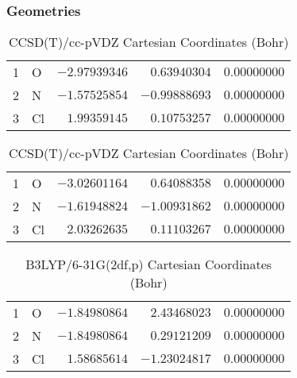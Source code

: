 \documentclass[10pt,oneside]{article}
\begin{document}
\begin{table}[h!]
\subsubsection*{Geometries}
\begin{multicols}{2}
\centering
\caption{CCSD(T)/cc-pVTZ Cartesian Coordinates (Bohr)}
\begin{tabular}{llrrr}
\toprule
1  & O  & $-2.97939346$ & $ 0.63940304$ & $ 0.00000000$ \\
2  & N  & $-1.57525854$ & $-0.99888693$ & $ 0.00000000$ \\
3  & Cl & $ 1.99359145$ & $ 0.10753257$ & $ 0.00000000$ \\
\bottomrule
\end{tabular}
\caption{CCSD(T)/cc-pVDZ Cartesian Coordinates (Bohr)}
\begin{tabular}{llrrr}
\toprule
1  & O  & $-3.02601164$ & $ 0.64088358$ & $ 0.00000000$ \\
2  & N  & $-1.61948824$ & $-1.00931862$ & $ 0.00000000$ \\
3  & Cl & $ 2.03262635$ & $ 0.11103267$ & $ 0.00000000$ \\
\bottomrule
\end{tabular}
\end{multicols}
\end{table}

\begin{table}[h]
\centering
\caption{B3LYP/6-31G(2df,p) Cartesian Coordinates (Bohr)}
\begin{tabular}{llrrr}
\toprule
1  & O  & $-1.84980864$ & $ 2.43468023$ & $ 0.00000000$ \\
2  & N  & $-1.84980864$ & $ 0.29121209$ & $ 0.00000000$ \\
3  & Cl & $ 1.58685614$ & $-1.23024817$ & $ 0.00000000$ \\
\bottomrule
\end{tabular}
\end{table}
\end{document}
